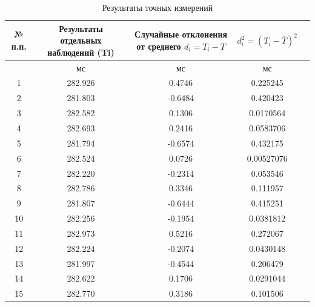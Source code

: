 \begin{center}
\begin{table}[h!]
\centering
\caption{Результаты точных измерений}
\label{tabl:2}
\begin{tabular}{|c|c|c|c|c|}
\hline
\begin{minipage}{7mm}
    № п.п. 
\end{minipage}&
\begin{minipage}{5cm}
    Результаты отдельных наблюдений (Ti)
\end{minipage} &
\begin{minipage}{5cm}
    Случайные отклонения от среднего $d_i = T_i - \overline{T}$
\end{minipage} &
\begin{minipage}{5cm}
     $d_i^2 = (T_i - \overline{T})^2$
\end{minipage}\\
\hline
{}&мс&мс&мс\\
\hline
1 &	282.926  &	0.4746 & 0.225245 \\
2 &	281.803  &	-0.6484	& 0.420423 \\
3 &	282.582  &	0.1306	& 0.0170564 \\
4 &	282.693  &	0.2416 & 0.0583706 \\
5 & 281.794  &	-0.6574 & 0.432175 \\
6 & 282.524  &	0.0726 & 0.00527076 \\
7 & 282.220  &	-0.2314 & 0.053546 \\
8 & 282.786  &	0.3346 & 0.111957 \\
9 & 281.807  &	-0.6444 & 0.415251 \\
10& 282.256  &	-0.1954 & 0.0381812 \\
11& 282.973  &	0.5216 & 0.272067 \\
12& 282.224  &	-0.2074 & 0.0430148 \\
13& 281.997  &	-0.4544 & 0.206479 \\
14& 282.622  &	0.1706 & 0.0291044 \\
15& 282.770  &	0.3186 & 0.101506 \\
\hline
\end{tabular}
\end{table}
\end{center}

